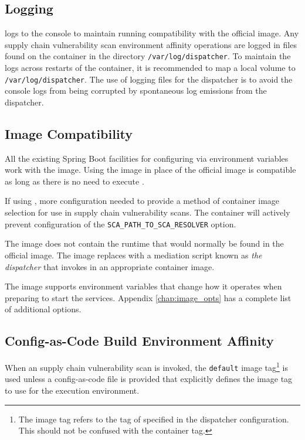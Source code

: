 \subsection{Logging}

\cxflow logs to the console to maintain running compatibility with the official \cxflow image.  
Any supply chain vulnerability scan environment affinity operations are logged in files found
on the container in the directory \texttt{/var/log/dispatcher}.  To maintain the logs across
restarts of the container, it is recommended to map a local volume to \texttt{/var/log/dispatcher}.
The use of logging files for the dispatcher is to avoid the console logs from being corrupted
by spontaneous log emissions from the dispatcher.


\subsection{\cxflow Image Compatibility}

All the existing Spring Boot facilities for configuring \cxflow via environment variables work 
with the \cxflowplusplus image.  Using the \cxflowplusplus image in place of the official
\cxflow image is compatible as long as there is no need to execute \scaresolver.

If using \scaresolver, more configuration needed to provide a method of container image selection
for use in supply chain vulnerability scans.  The container will actively prevent
configuration of the \cxflow \texttt{SCA\_PATH\_TO\_SCA\_RESOLVER} option.  

The \cxflowplusplus image does not contain the \scaresolver runtime that would normally be found
in the official \cxflow image.  The \cxflowplusplus image replaces \scaresolver with
a mediation script known as \textit{the dispatcher} that invokes \scaresolver in an appropriate
container image.

The \cxflowplusplus image supports environment variables that change how it operates when 
preparing to start the \cxflow services.  Appendix \ref{chap:image_opts} has a complete list
of \cxflowplusplus additional options.


\subsection{Config-as-Code Build Environment Affinity}
When an supply chain vulnerability scan is invoked, the \texttt{default} 
image tag\footnote{The image tag refers to the tag of specified in the dispatcher configuration.  This should not be confused with the container tag.}
is used unless a config-as-code file is provided that explicitly defines the
image tag to use for the execution environment.

